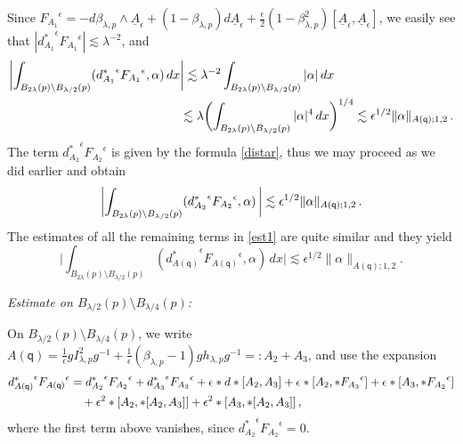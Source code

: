 \documentclass[11pt]{article}
\numberwithin{equation}{section} \setlength{\topmargin}{-35pt}
\newcommand{\q}{\mathsf{q}}
\begin{document}
Since
${F_{A_1}}^{\epsilon}=-d\beta_{\lambda,p}\wedge\underline{A}_{\epsilon}+(1-\beta_{\lambda,p})d\underline{A}_{\epsilon}+
\frac{\epsilon}{2}(1-\beta_{\lambda,p}^2)[\underline{A}_{\epsilon},\underline{A}_{\epsilon}]$,
we easily see that
$|{d_{A_1}^{\ast}}^{\epsilon}{F_{A_1}}^{\epsilon}|\lesssim\lambda^{-2}$,
and
\begin{align}
\biggl|\int_{B_{2\lambda}(p)\setminus
B_{\lambda/2}(p)}({d_{A_1}^{\ast}}^{\epsilon}{F_{A_1}}^{\epsilon},\alpha)\,dx&\biggr|
\lesssim\lambda^{-2}\int_{B_{2\lambda}(p)\setminus B_{\lambda/2}(p)}|\alpha|\,dx\notag\\
 &\lesssim\lambda\biggl(\int_{B_{2\lambda}(p)\setminus
B_{\lambda/2}(p)}|\alpha|^4\,dx\biggr)^{1/4}\lesssim\epsilon^{1/2}\|\alpha\|_{A(\q);1,2}\,.\notag
\end{align}
The term ${d_{A_2}^{\ast}}^{\epsilon}{F_{A_2}}^{\epsilon}$ is given
by the formula \eqref{distar}, thus we may proceed as we did earlier
and obtain
\begin{equation}
\biggl|\int_{B_{2\lambda}(p)\setminus
B_{\lambda/2}(p)}({d_{A_2}^{\ast}}^{\epsilon}{F_{A_2}}^{\epsilon},\alpha)\,
\biggr|\lesssim\epsilon^{1/2}\|\alpha\|_{A(\q);1,2}\,.\notag
\end{equation}
The estimates of all the remaining terms in \eqref{est1} are quite
similar and they yield
\begin{equation}
\label{begin2bis} \biggl|\int_{B_{2\lambda}(p)\setminus
B_{\lambda/2}(p)}({d_{A(\q)}^{\ast}}^{\epsilon}{F_{A(\q)}}^{\epsilon},\alpha)\,dx
\biggr|\lesssim\epsilon^{1/2}\|\alpha\|_{A(\q);1,2}.
\end{equation}

\medskip

\textit{Estimate on $B_{\lambda/2}(p)\setminus B_{\lambda/4}(p)$:}

\noindent On $B_{\lambda/2}(p)\setminus B_{\lambda/4}(p)$, we write
$A(\q)=\frac{1}{\epsilon}gI^2_{\lambda,p}g^{-1}+
\frac{1}{\epsilon}(\beta_{\lambda,p}-1)gh_{\lambda,p}g^{-1}=:A_2+A_3$,
and use the expansion
\begin{align}
\label{3.49}
{d_{A(\q)}^{\ast}}^{\epsilon}{F_{A(\q)}}^{\epsilon}&={d_{A_2}^{\ast}}^{\epsilon}{F_{A_2}}^{\epsilon}+{d_{A_3}^{\ast}}^{\epsilon}{F_{A_3}}^{\epsilon}+\epsilon\ast
d\ast[A_2,A_3]+\epsilon\ast[A_2,\ast {F_{A_3}}^{\epsilon}]+
\epsilon\ast[A_3,\ast {F_{A_2}}^{\epsilon}]\notag\\
 &\quad+\epsilon^2\ast[A_2,\ast[A_2,A_3]]+\epsilon^2\ast[A_3,\ast[A_2,A_3]]\,,
\end{align}
where the first term above vanishes, since
${d_{A_2}^{\ast}}^{\epsilon}{F_{A_2}}^{\epsilon}=0$.
\end{document}
